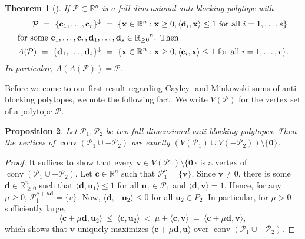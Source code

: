 \documentclass[11pt]{amsart}
\newtheorem{thm}{Theorem}[section]
\newtheorem{prop}[thm]{Proposition}
\theoremstyle{definition}
\begin{document}
\begin{thm}[{\cite[Thm.~9.4]{Schrijver}}] \label{thm:doubleAnt}
    If ${\mathcal{P}} \subset {\mathbb{R}}^n$ is a full-dimensional anti-blocking polytope with
    \begin{align*}
        {\mathcal{P}} \ = \ {\{{{\mathbf{c}}_1,\dots,{\mathbf{c}}_r}\}^{\downarrow}} &\ = \ \{ {\mathbf{x}} \in {\mathbb{R}}^n : {\mathbf{x}} \ge 0,
        {\langle{{{\mathbf{d}}_i,{\mathbf{x}}}}\rangle} \le 1 \text{ for all } i=1,\dots,s\} \\
    \intertext{for some ${\mathbf{c}}_1,\dots,{\mathbf{c}}_r,{\mathbf{d}}_1,\dots,{\mathbf{d}}_s \in {{\mathbb{R}}_{\ge0}}^n$.  Then}
        {A({{\mathcal{P}}})} \ = \ {\{{{\mathbf{d}}_1,\dots,{\mathbf{d}}_s}\}^{\downarrow}} &\ = \ \{ {\mathbf{x}} \in {\mathbb{R}}^n : {\mathbf{x}} \ge
        0, {\langle{{{\mathbf{c}}_i,{\mathbf{x}}}}\rangle} \le 1 \text{ for all } i=1,\dots,r\}.
    \end{align*}
    In particular, ${A({{{A({{\mathcal{P}}})}}})} = {\mathcal{P}}$.
\end{thm}

Before we come to our first result regarding Cayley- and Minkowski-sums of
anti-blocking polytopes, we note the following fact. We write $V({\mathcal{P}})$ for the
vertex set of a polytope ${\mathcal{P}}$.

\begin{prop}\label{prop:ab_vert_union}
    Let ${\mathcal{P}}_1, {\mathcal{P}}_2$ be two full-dimensional anti-blocking polytopes. Then
    the vertices of $\operatorname{conv}({\mathcal{P}}_1 \cup -{\mathcal{P}}_2)$ are exactly $(V({\mathcal{P}}_1) \cup
    V(-{\mathcal{P}}_2)) \setminus \{{\mathbf{0}}\}$.
\end{prop}
\begin{proof}
    It suffices to show that every ${\mathbf{v}} \in V({\mathcal{P}}_1) \setminus \{{\mathbf{0}}\}$ is a
    vertex of $\operatorname{conv}({\mathcal{P}}_1 \cup -{\mathcal{P}}_2)$.  Let ${\mathbf{c}} \in {\mathbb{R}}^n$ such that ${\mathcal{P}}_1^{\mathbf{c}}
    = \{{\mathbf{v}}\}$.  Since ${\mathbf{v}} \neq 0$, there is some ${\mathbf{d}} \in {\mathbb{R}}^n_{\ge 0}$ such
    that ${\langle{{{\mathbf{d}}, {\mathbf{u}}_1}}\rangle} \le 1$ for all ${\mathbf{u}}_1 \in {\mathcal{P}}_1$ and ${\langle{{{\mathbf{d}}, {\mathbf{v}}}}\rangle}
    = 1$.  Hence, for any $\mu \ge 0$, ${\mathcal{P}}_1^{{\mathbf{c}} + \mu {\mathbf{d}}} = \{v\}$. Now,
    ${\langle{{{\mathbf{d}},-{\mathbf{u}}_2}}\rangle} \le 0$ for all ${\mathbf{u}}_2 \in P_2$. In particular, for $\mu >
    0$ sufficiently large, 
    \[
        {\langle{{{\mathbf{c}} + \mu {\mathbf{d}},{\mathbf{u}}_2}}\rangle}  \ \le \ {\langle{{{\mathbf{c}},{\mathbf{u}}_2}}\rangle}  \ < \ \mu +
        {\langle{{{\mathbf{c}},{\mathbf{v}}}}\rangle} \ = \  {\langle{{{\mathbf{c}} + \mu {\mathbf{d}},{\mathbf{v}}}}\rangle},
    \]
    which shows that ${\mathbf{v}}$ uniquely maximizes ${\langle{{{\mathbf{c}} + \mu{\mathbf{d}},{\mathbf{u}}}}\rangle}$ over
    $\operatorname{conv}({\mathcal{P}}_1 \cup -{\mathcal{P}}_2)$.
\end{proof}
\end{document}
